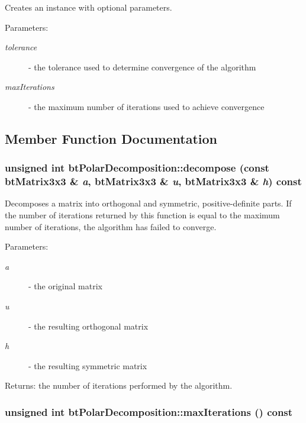 Creates an instance with optional parameters.

\begin{Desc}
\item[Parameters:]
\begin{description}
\item[{\em tolerance}]- the tolerance used to determine convergence of the algorithm \item[{\em maxIterations}]- the maximum number of iterations used to achieve convergence \end{description}
\end{Desc}


\subsection{Member Function Documentation}
\hypertarget{classbt_polar_decomposition_6ab0c88b30522ab42b6202a2f7a17eab}{
\subsubsection[decompose]{\setlength{\rightskip}{0pt plus 5cm}unsigned int btPolarDecomposition::decompose (const btMatrix3x3 \& {\em a}, \/  btMatrix3x3 \& {\em u}, \/  btMatrix3x3 \& {\em h}) const}}
\label{classbt_polar_decomposition_6ab0c88b30522ab42b6202a2f7a17eab}


Decomposes a matrix into orthogonal and symmetric, positive-definite parts. If the number of iterations returned by this function is equal to the maximum number of iterations, the algorithm has failed to converge.

\begin{Desc}
\item[Parameters:]
\begin{description}
\item[{\em a}]- the original matrix \item[{\em u}]- the resulting orthogonal matrix \item[{\em h}]- the resulting symmetric matrix\end{description}
\end{Desc}
\begin{Desc}
\item[Returns:]the number of iterations performed by the algorithm. \end{Desc}
\hypertarget{classbt_polar_decomposition_c999bd3afdcc94a43ddbea028b5d4867}{
\subsubsection[maxIterations]{\setlength{\rightskip}{0pt plus 5cm}unsigned int btPolarDecomposition::maxIterations () const}}
\label{classbt_polar_decomposition_c999bd3afdcc94a43ddbea028b5d4867}


